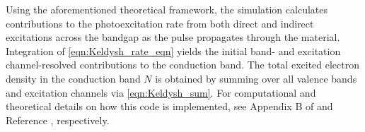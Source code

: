 Using the aforementioned theoretical framework, the simulation calculates contributions to the photoexcitation rate from both direct and indirect excitations across the bandgap as the pulse propagates through the material. Integration of \cref{eqn:Keldysh_rate_eqn} yields the initial band- and excitation channel-resolved contributions to the conduction band. The total excited electron density in the conduction band $N$ is obtained by summing over all valence bands and excitation channels via \cref{eqn:Keldysh_sum}. For computational and theoretical details on how this code is implemented, see Appendix B of \cite{austinSemiconductorSurfaceModification2017} and Reference \cite{sergaevaUltrafastExcitationConductionband2018}, respectively.




